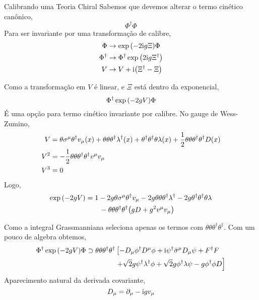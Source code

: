 \documentclass{beamer}
\begin{document}
\begin{frame}{Calibrando uma Teoria Chiral}
    Sabemos que devemos alterar o termo cinético canônico,\[\Phi^\dagger\Phi\]
    Para ser invariante por uma transformação de calibre,
    \begin{align*}
        \Phi&\rightarrow\exp\qty(-2\textnormal{i} g\Xi)\Phi\\
        \Phi^\dagger&\rightarrow\Phi^\dagger\exp\qty(2\textnormal{i} g \Xi^\dagger)\\
        V&\rightarrow V+\textnormal{i}\qty(\Xi^\dagger-\Xi)
    \end{align*}
\end{frame}

\begin{frame}
    Como a transformação em $V$ é linear, e $\Xi$ está dentro da exponencial,
    \[\Phi^\dagger\exp\qty(-2gV)\Phi\]
    É uma opção para termo cinético invariante por calibre. No gauge de Wess-Zumino,
    \begin{align*}
        V&=\theta\sigma^\mu\theta^\dagger v_\mu\qty(x)+\theta\theta\theta^\dagger\lambda^\dagger\qty(x)
        +\theta^\dagger\theta^\dagger\theta\lambda\qty(x)+\frac12\theta\theta\theta^\dagger\theta^\dagger D\qty(x)\\
        V^2&=-\frac12\theta\theta\theta^\dagger\theta^\dagger v^\mu v_\mu\\
        V^3&=0
    \end{align*}
    Logo,
    \begin{align*}
        \exp\qty(-2gV)&=1-2g\theta\sigma^\mu\theta^\dagger v_\mu-2g\theta\theta\theta^\dagger\lambda^\dagger-2g\theta^\dagger\theta^\dagger\theta\lambda\\
        &\quad\quad-\theta\theta\theta^\dagger\theta^\dagger\qty(gD+g^2v^\mu v_\mu)
    \end{align*}
\end{frame}

\begin{frame}
    Como a integral Grassmanniana seleciona apenas os termos com $\theta\theta\theta^\dagger\theta^\dagger$. 
    Com um pouco de algebra obtemos,
    \begin{align*}
        \Phi^\dagger\exp\qty(-2gV)\Phi\supset\theta\theta\theta^\dagger\theta^\dagger&\left[-D_\mu\phi^\dagger D^\mu\phi+\textnormal{i}\psi^\dagger{\bar\sigma}^\mu D_\mu\psi+F^\dagger F\right.\\
        &\left.+\sqrt2g\psi^\dagger\lambda^\dagger\phi+\sqrt2g\phi^\dagger\lambda\psi-g\phi^\dagger\phi D\right]
    \end{align*}
    Aparecimento natural da derivada covariante,
    \[D_\mu=\partial_\mu-\textnormal{i} gv_\mu\]
\end{frame}
\end{document}
